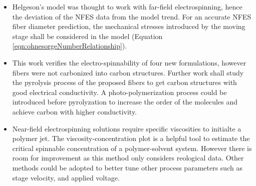 \begin{itemize}
\item Helgeson's model \cite{Helgeson2007} was thought to work with far-field electrospinning, hence the deviation of the NFES data from the model trend. For an accurate NFES fiber diameter prediction, the mechanical stresses introduced by the moving stage shall be considered in the model (Equation \ref{eqn:ohnesorgeNumberRelationship}). 
\item This work verifies the electro-spinnability of four new formulations, however fibers were not carbonized into carbon structures. Further work shall study the pyrolysis process of the proposed fibers to get carbon structures with good electrical conductivity. A photo-polymerization process could be introduced before pyrolyzation to increase the order of the molecules and achieve carbon with higher conductivity.
\item Near-field electrospinning solutions require specific viscosities to initialte a polymer jet. The viscosity-concentration plot is a helpful tool to estimate the critical spinnable concentration of a polymer-solvent system. However there is room for improvement as this method only considers reological data. Other methods could be adopted to better tune other process parameters such as stage velocity, and applied voltage.
\end{itemize}
